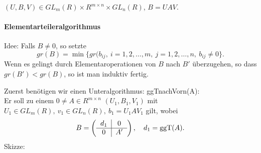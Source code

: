 \documentclass[a4paper,DIV15,BCOR12mm]{article}
\begin{document}

$(U,B,V) \in GL_m(R) \times R^{m\times n} \times GL_n(R)$, $B=UAV$.
\paragraph{Elementarteileralgorithmus} Idee: Falls $B \neq 0$, so
setzte
\[
    gr(B)=\min\{gr(b_{ij},\ i=1,2,\dotsc,m,\ j=1,2,\dotsc,n,\
    b_{ij}\neq 0 \}.
\]
Wenn es gelingt durch Elementaroperationen von $B$ nach $B'$
überzugehen, so dass $gr(B')<gr(B)$, so ist man induktiv fertig.

Zuerst benötigen wir einen Unteralgorithmus: ggTnachVorn(A):\\
Er soll zu einem $0\neq A \in R^{m\times n}$ $(U_1,B_1,V_1)$ mit
$U_1\in GL_m(R),\ v_1\in GL_n(R),\ b_1=U_1 A V_1$ gilt, wobei
\[
    B=\left(\begin{tabular}{c|c} $d_1$& 0\\\hline 0 & $A'$
    \end{tabular}\right),\quad d_1=\ggt(A).
\]
Skizze:\\
\end{document}

